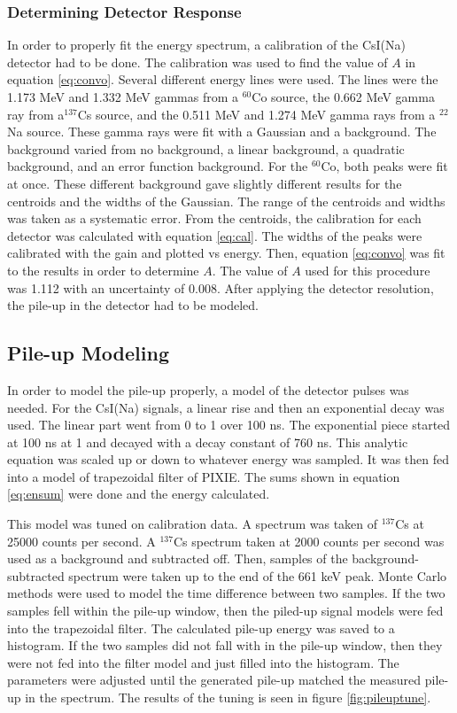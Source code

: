 \documentclass[../MaxHughesThesis.tex]{subfiles}
\begin{document}
\subsubsection{Determining Detector Response}
In order to properly fit the energy spectrum, a calibration of the CsI(Na) detector had to be done.
The calibration was used to find the value of $A$ in equation \ref{eq:convo}.
Several different energy lines were used.
The lines were the 1.173 MeV and 1.332 MeV gammas from a $^{60}$Co source, the 0.662 MeV gamma ray from a$^{137}$Cs source, and the 0.511 MeV and 1.274 MeV gamma rays from a $^{22}$Na source.
These gamma rays were fit with a Gaussian and a background.
The background varied from no background, a linear background, a quadratic background, and an error function background.
For the $^{60}$Co, both peaks were fit at once.
These different background gave slightly different results for the centroids and the widths of the Gaussian.
The range of the centroids and widths was taken as a systematic error.
From the centroids, the calibration for each detector was calculated with equation \ref{eq:cal}. 
The widths of the peaks were calibrated with the gain and plotted vs energy.
Then, equation \ref{eq:convo} was fit to the results in order to determine $A$.
The value of $A$ used for this procedure was 1.112 with an uncertainty of 0.008.
After applying the detector resolution, the pile-up in the detector had to be modeled.

\subsection{Pile-up Modeling}
In order to model the pile-up properly, a model of the detector pulses was needed. 
For the CsI(Na) signals, a linear rise and then an exponential decay was used.
The linear part went from 0 to 1 over 100 ns. 
The exponential piece started at 100 ns at 1 and decayed with a decay constant of 760 ns.
This analytic equation was scaled up or down to whatever energy was sampled.
It was then fed into a model of trapezoidal filter of PIXIE. 
The sums shown in equation \ref{eq:ensum} were done and the energy calculated.

This model was tuned on calibration data. 
A spectrum was taken of $^{137}$Cs at 25000 counts per second.
A  $^{137}$Cs spectrum taken at 2000 counts per second was used as a background and subtracted off.
Then, samples of the background-subtracted spectrum were taken up to the end of the 661 keV peak.
Monte Carlo methods were used to model the time difference between two samples.
If the two samples fell within the pile-up window, then the piled-up signal models were fed into the trapezoidal filter.
The calculated pile-up energy was saved to a histogram.
If the two samples did not fall with in the pile-up window, then they were not fed into the filter model and just filled into the histogram.
The parameters were adjusted until the generated pile-up matched the measured pile-up in the spectrum.
The results of the tuning is seen in figure \ref{fig:pileuptune}.
\end{document}

